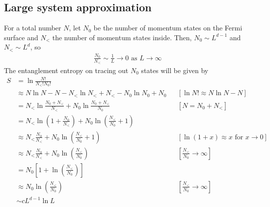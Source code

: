 \documentclass[12pt,twoside]{article}
\numberwithin{equation}{section}
\begin{document}
{\subsection{Large system approximation}
For a total number \(N\), let \(N_0\) be the number of momentum states on the Fermi surface and \(N_<\) the number of momentum states inside. Then, \(N_0 \sim L^{d-1}\) and \(N_< \sim L^d\), so
\begin{equation}\begin{aligned}
	\frac{N_0}{N_<} \sim \frac{1}{L} \to 0 \text{ as }L \to \infty
\end{aligned}\end{equation}
The entanglement entropy on tracing out \(N_0\) states will be given by
\begin{equation}\begin{aligned}
	S &= \ln \frac{N!}{N_< ! N_0 !}\\
	  &\approx N\ln N - N - N_<\ln N_< + N_< - N_0\ln N_0 + N_0 && \left[ \ln N! \approx N\ln N - N \right] \\
	  &= N_<\ln \frac{N_0 + N_<}{N_<} + N_0 \ln \frac{N_0 + N_<}{N_0} && \left[ N = N_0 + N_< \right] \\
	  &= N_<\ln \left(1 + \frac{N_0}{N_<}\right) + N_0 \ln \left(\frac{N_<}{N_0}+1\right)\\
	  &\approx N_< \frac{N_0}{N_<} + N_0 \ln \left(\frac{N_<}{N_0}+1\right) && \left[ \ln (1+x) \approx x \text{ for } x \to 0\right] \\
	  &\approx N_< \frac{N_0}{N_<} + N_0 \ln \left(\frac{N_<}{N_0}\right) && \left[\frac{N_<}{N_0}\to \infty\right] \\
	  &= N_0\left[1 + \ln \left(\frac{N_<}{N_0}\right)\right]\\
	  &\approx N_0\ln \left(\frac{N_<}{N_0}\right) && \left[\frac{N_<}{N_0}\to \infty\right]\\
	  &\sim cL^{d-1}\ln L
\end{aligned}\end{equation}

}
\end{document}
